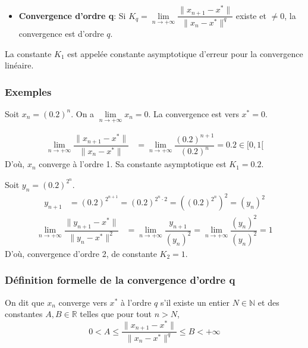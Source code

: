 \documentclass[oneside]{book}
\begin{document}
\begin{itemize}
    \item \textbf{Convergence d'ordre q}: Si $K_q = \lim\limits_{n \to +\infty} \dfrac{\|x_{n+1}-x^*\|}{\|x_n-x^*\|^q}$ existe et $\neq 0$, la convergence est d'ordre $q$.
\end{itemize}

\begin{remark}
La constante $K_1$ est appelée constante asymptotique d'erreur pour la convergence linéaire.
\end{remark}

\subsubsection{Exemples}

\begin{example}
Soit $x_n = (0.2)^n$.
On a $\lim\limits_{n \to +\infty} x_n = 0$. La convergence est vers $x^* = 0$.

\begin{align*}
\lim\limits_{n \to +\infty} \dfrac{\|x_{n+1}-x^*\|}{\|x_n-x^*\|} &= \lim\limits_{n \to +\infty} \dfrac{(0.2)^{n+1}}{(0.2)^n} = 0.2 \in [0, 1[
\end{align*}
D'où, $x_n$ converge à l'ordre 1.
Sa constante asymptotique est $K_1 = 0.2$.
\end{example}

\begin{example}
Soit $y_n = (0.2)^{2^n}$.
\begin{align*}
y_{n+1} &= (0.2)^{2^{n+1}} = (0.2)^{2^n \cdot 2} = ((0.2)^{2^n})^2 = (y_n)^2
\end{align*}
\begin{align*}
\lim\limits_{n \to +\infty} \dfrac{\|y_{n+1}-x^*\|}{\|y_n-x^*\|^2} &= \lim\limits_{n \to +\infty} \dfrac{y_{n+1}}{(y_n)^2} = \lim\limits_{n \to +\infty} \dfrac{(y_n)^2}{(y_n)^2} = 1
\end{align*}
D'où, convergence d'ordre 2, de constante $K_2 = 1$.
\end{example}

\subsubsection{Définition formelle de la convergence d'ordre q}

\begin{definition}
On dit que $x_n$ converge vers $x^*$ à l'ordre $q$ s'il existe un entier $N \in \mathbb{N}$ et des constantes $A, B \in \mathbb{R}$ telles que pour tout $n > N$,
$$ 0 < A \leq \dfrac{\|x_{n+1}-x^*\|}{\|x_n-x^*\|^q} \leq B < +\infty $$
\end{definition}
\end{document}

